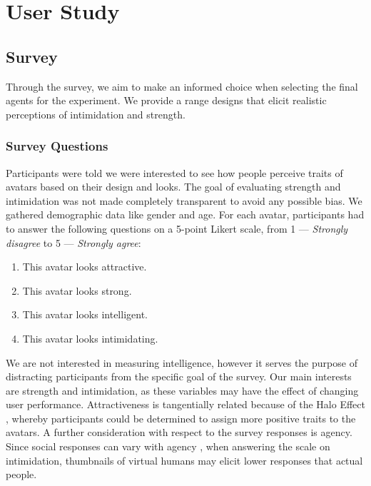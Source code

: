 \section{User Study}
\subsection{Survey}
\label{section:survey}
Through the survey, we aim to make an informed choice when selecting the final agents for the experiment. We provide a range designs that elicit realistic perceptions of intimidation and strength. 

\subsubsection{Survey Questions}
Participants were told we were interested to see how people perceive traits of avatars based on their design and looks. The goal of evaluating strength and intimidation was not made completely transparent to avoid any possible bias. We gathered demographic data like gender and age. For each avatar, participants had to answer the following questions on a 5-point Likert scale, from 1 --- \textit{Strongly disagree} to 5 --- \textit{Strongly agree}:
\begin{enumerate}
\itemsep0em 
\item This avatar looks attractive.
\item This avatar looks strong.
\item This avatar looks intelligent.
\item This avatar looks intimidating.
\end{enumerate}
We are not interested in measuring intelligence, however it serves the purpose of distracting participants from the specific goal of the survey. Our main interests are strength and intimidation, as these variables may have the effect of changing user performance. Attractiveness is tangentially related because of the Halo Effect \cite{nisbett1977halo}, whereby participants could be determined to assign more positive traits to the avatars. A further consideration with respect to the survey responses is agency. Since social responses can vary with agency \cite{fox2015avatars}, when answering the scale on intimidation, thumbnails of virtual humans may elicit lower responses that actual people.
 
